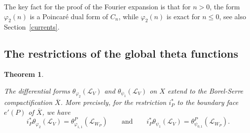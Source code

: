 \documentclass[12pt,leqno]{amsart}
\numberwithin{equation}{section}
\theoremstyle{plain}
\newtheorem{theorem}{Theorem}[section]
\theoremstyle{definition}
\theoremstyle{remark}
\newcommand{\calL}{\mathcal{L}}
\begin{document}
The key fact for the proof of the Fourier expansion is that for $n>0$, the form $\varphi_2(n)$ is a Poincar\'e dual form of $C_n$, while $\varphi_2(n)$ is exact for $n \leq 0$, see also Section~\ref{currents}. 








\subsection{The restrictions of the global theta functions}


\begin{theorem}\label{restriction}

The differential forms $\theta_{\varphi_2}(\calL_V)$ and $\theta_{\psi_1}(\calL_V)$ on $X$ extend to the Borel-Serre compactification $\overline{X}$. More precisely, for the restriction $i_P^{\ast}$ to the boundary face $e'(P)$ of $\overline{X}$, we have
\[
i_P^{\ast} \theta_{\varphi_2}(\calL_V) = \theta^P_{\varphi_{1,1}}(\calL_{W_P}) \qquad \text{and} \qquad i_P^{\ast} \theta_{\psi_1}(\calL_V) =  \theta^P_{\psi_{0,1}}(\calL_{W_P}). 
\]
\end{theorem}
\end{document}
